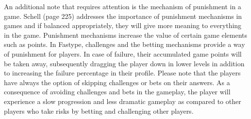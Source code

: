 An additional note that requires attention is the mechanism of punishment in a game. Schell \cite{51} (page 225) addresses the importance of punishment mechanisms in games and if balanced appropriately, they will give more meaning to everything in the game. Punishment mechanisms increase the value of certain game elements such as points. In Fastype, challenges and the betting mechanisms provide a way of punishment for players. In case of failure, their accumulated game points will be taken away, subsequently dragging the player down in lower levels in addition to increasing the failure percentage in their profile. Please note that the players have always the option of skipping challenges or bets on their answers. As a consequence of avoiding challenges and bets in the gameplay, the player will experience a slow progression and less dramatic gameplay as compared to other players who take risks by betting and challenging other players.